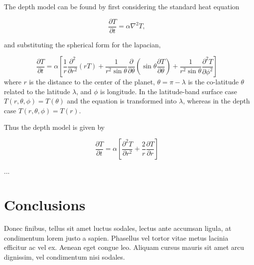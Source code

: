 \documentclass[12pt, onecolumn]{revtex4-2}    %
\begin{document}
The depth model can be found by first considering the standard heat equation

\begin{equation}
    \frac{\partial T}{\partial t} = \alpha \nabla^2 T,
\end{equation}

and substituting the spherical form for the lapacian,

\begin{equation}
    \frac{\partial T}{\partial t}  = \alpha \left[\frac{1}{r} \frac{\partial^2 }{\partial r^2} (r T)
        + \frac{1}{r^2 \sin\theta} \frac{\partial}{\partial \theta}\left(\sin\theta \frac{\partial T}{\partial\theta}\right)
        + \frac{1}{r^2 \sin\theta} \frac{\partial^2 T}{\partial \phi^2} \right]
\end{equation}
where $r$ is the distance to the center of the planet, $\theta = \pi - \lambda$ is the co-latitude $\theta$ related to the latitude $\lambda$, and $\phi$ is longitude.
In the latitude-band surface case $T(r, \theta, \phi) = T(\theta)$ and the equation is transformed into $\lambda$, whereas in the depth case $T(r, \theta, \phi) = T(r)$.

Thus the depth model is given by

\begin{equation}
    \frac{\partial T}{\partial t} = \alpha \left[\frac{\partial^2 T}{\partial r^2} + \frac{2}{r}\frac{\partial T}{\partial r}\right]
\end{equation}

...

\section{Conclusions} \label{sec:conclusion}

Donec finibus, tellus sit amet luctus sodales, lectus ante accumsan ligula, at condimentum lorem justo a sapien. Phasellus vel tortor vitae metus lacinia efficitur ac vel ex. Aenean eget congue leo. Aliquam cursus mauris sit amet arcu dignissim, vel condimentum nisi sodales.

\end{document}
